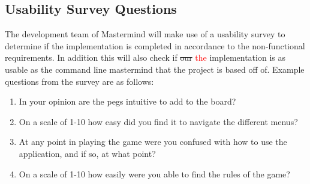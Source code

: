 \documentclass[12pt, titlepage]{article}
\begin{document}
\subsection{Usability Survey Questions}

The development team of Mastermind will make use of a usability survey to determine if the implementation is completed in accordance to the non-functional requirements. In addition this will also check if \sout{our} \textcolor{red}{the} implementation is as usable as the command line mastermind that the project is based off of. Example questions from the survey are as follows:

\begin{enumerate}
\item{In your opinion are the pegs intuitive to add to the board?}
\item{On a scale of 1-10 how easy did you find it to navigate the different menus?}
\item{At any point in playing the game were you confused with how to use the application, and if so, at what point?}
\item{On a scale of 1-10 how easily were you able to find the rules of the game?}
\end{enumerate}
\end{document}

